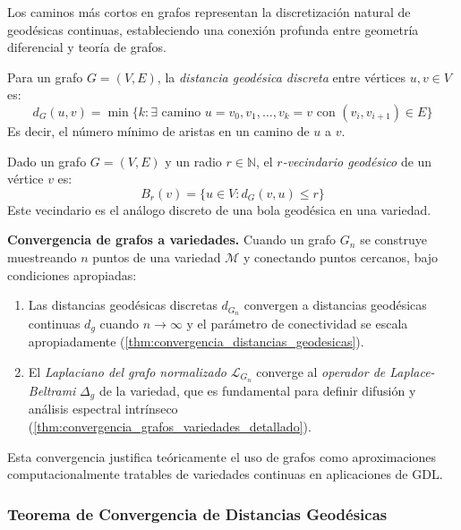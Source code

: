 Los caminos más cortos en grafos representan la discretización natural de geodésicas continuas, estableciendo una conexión profunda entre geometría diferencial y teoría de grafos.

\begin{definition}\label{def:distancia_geodesica_grafo}
Para un grafo $G = (V, E)$, la \textit{distancia geodésica discreta} entre vértices $u, v \in V$ es:
\[
d_G(u,v) = \min\{k : \exists \text{ camino } u = v_0, v_1, \ldots, v_k = v \text{ con } (v_i, v_{i+1}) \in E\}
\]
Es decir, el número mínimo de aristas en un camino de $u$ a $v$.
\end{definition}

\begin{definition}\label{def:grafo_vecindad_geodesico}
Dado un grafo $G = (V, E)$ y un radio $r \in \mathbb{N}$, el \textit{$r$-vecindario geodésico} de un vértice $v$ es:
\[
B_r(v) = \{u \in V : d_G(v, u) \leq r\}
\]
Este vecindario es el análogo discreto de una bola geodésica en una variedad.
\end{definition}

\textbf{Convergencia de grafos a variedades.}\label{rem:convergencia_grafos_variedades} Cuando un grafo $G_n$ se construye muestreando $n$ puntos de una variedad $\mathcal{M}$ y conectando puntos cercanos, bajo condiciones apropiadas:
\begin{enumerate}
	\item Las distancias geodésicas discretas $d_{G_n}$ convergen a distancias geodésicas continuas $d_g$ cuando $n \to \infty$ y el parámetro de conectividad se escala apropiadamente (\autoref{thm:convergencia_distancias_geodesicas}).

	\item El \textit{Laplaciano del grafo normalizado} $\mathcal{L}_{G_n}$ converge al \textit{operador de Laplace-Beltrami} $\Delta_g$ de la variedad, que es fundamental para definir difusión y análisis espectral intrínseco (\autoref{thm:convergencia_grafos_variedades_detallado}).
\end{enumerate}
Esta convergencia justifica teóricamente el uso de grafos como aproximaciones computacionalmente tratables de variedades continuas en aplicaciones de \gls{GDL}.

\subsubsection{Teorema de Convergencia de Distancias Geodésicas}

